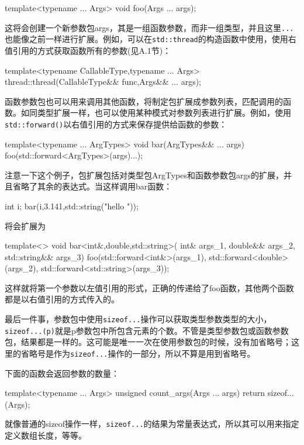 \begin{cpp}
template<typename ... Args>
void foo(Args ... args);
\end{cpp}

这将会创建一个新参数包args，其是一组函数参数，而非一组类型，并且这里\texttt{...}也能像之前一样进行扩展。例如，可以在\texttt{std::thread}的构造函数中使用，使用右值引用的方式获取函数所有的参数(见A.1节)：

\begin{cpp}
template<typename CallableType,typename ... Args>
thread::thread(CallableType&& func,Args&& ... args);
\end{cpp}

函数参数包也可以用来调用其他函数，将制定包扩展成参数列表，匹配调用的函数。如同类型扩展一样，也可以使用某种模式对参数列表进行扩展。例如，使用\texttt{std::forward()}以右值引用的方式来保存提供给函数的参数：

\begin{cpp}
template<typename ... ArgTypes>
void bar(ArgTypes&& ... args)
{
  foo(std::forward<ArgTypes>(args)...);
}
\end{cpp}

注意一下这个例子，包扩展包括对类型包ArgTypes和函数参数包args的扩展，并且省略了其余的表达式。当这样调用bar函数：

\begin{cpp}
int i;
bar(i,3.141,std::string("hello "));
\end{cpp}

将会扩展为

\begin{cpp}
template<>
void bar<int&,double,std::string>(
         int& args_1,
         double&& args_2,
         std::string&& args_3)
{
  foo(std::forward<int&>(args_1),
      std::forward<double>(args_2),
      std::forward<std::string>(args_3));
}
\end{cpp}

这样就将第一个参数以左值引用的形式，正确的传递给了foo函数，其他两个函数都是以右值引用的方式传入的。

最后一件事，参数包中使用\texttt{sizeof...}操作可以获取类型参数类型的大小，\texttt{sizeof...(p)}就是p参数包中所包含元素的个数。不管是类型参数包或函数参数包，结果都是一样的。这可能是唯一一次在使用参数包的时候，没有加省略号；这里的省略号是作为\texttt{sizeof...}操作的一部分，所以不算是用到省略号。

下面的函数会返回参数的数量：

\begin{cpp}
template<typename ... Args>
unsigned count_args(Args ... args)
{
  return sizeof... (Args);
}
\end{cpp}

就像普通的sizeof操作一样，\texttt{sizeof...}的结果为常量表达式，所以其可以用来指定定义数组长度，等等。